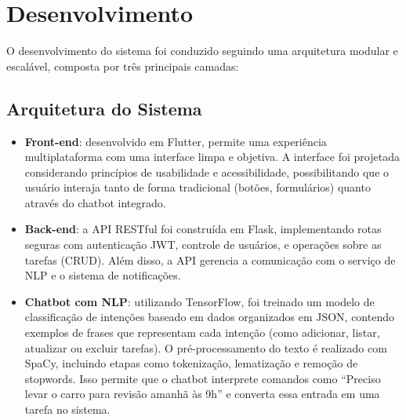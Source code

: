 \documentclass[a4paper,12pt]{article}
\begin{document}
\section{Desenvolvimento}

O desenvolvimento do sistema foi conduzido seguindo uma arquitetura modular e escalável, composta por três principais camadas:

\subsection{Arquitetura do Sistema}

\begin{itemize}
    \item \textbf{Front-end}: desenvolvido em Flutter, permite uma experiência multiplataforma com uma interface limpa e objetiva. A interface foi projetada considerando princípios de usabilidade e acessibilidade, possibilitando que o usuário interaja tanto de forma tradicional (botões, formulários) quanto através do chatbot integrado.
    
    \item \textbf{Back-end}: a API RESTful foi construída em Flask, implementando rotas seguras com autenticação JWT, controle de usuários, e operações sobre as tarefas (CRUD). Além disso, a API gerencia a comunicação com o serviço de NLP e o sistema de notificações.
    
    \item \textbf{Chatbot com NLP}: utilizando TensorFlow, foi treinado um modelo de classificação de intenções baseado em dados organizados em JSON, contendo exemplos de frases que representam cada intenção (como adicionar, listar, atualizar ou excluir tarefas). O pré-processamento do texto é realizado com SpaCy, incluindo etapas como tokenização, lematização e remoção de stopwords. Isso permite que o chatbot interprete comandos como “Preciso levar o carro para revisão amanhã às 9h” e converta essa entrada em uma tarefa no sistema.
\end{itemize}
\end{document}
